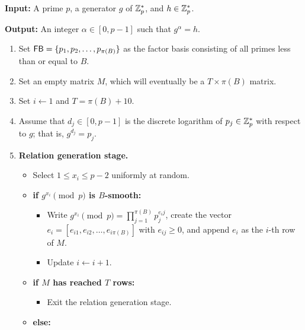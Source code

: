 \begin{algo}~

      {\bf Input:} A prime $p$, a generator $g$ of $\mathbb{Z}_p^*$, and $h \in \mathbb{Z}_p^*$. 
      
      {\bf Output:} An integer $\alpha \in [0, p-1]$ such that $g^\alpha = h$.

      \begin{enumerate}[1.]
            \item Set ${\sf FB} = \{p_1, p_2, \dots, p_{\pi(B)}\}$ as the factor basis 
                  consisting of all primes less than or equal to $B$. 
            \item Set an empty matrix $M$, which will eventually be a $T \times 
                  \pi(B)$ matrix. 
            \item Set $i \gets 1$ and $T = \pi(B) + 10$. 
            \item Assume that $d_j \in [0, p-1]$ is the discrete logarithm 
                  of $p_j \in \mathbb{Z}_p^*$ with respect to $g$; that is, $g^{d_j} = p_j$.
            \item {\bf Relation generation stage.} 
                  \begin{itemize}
                        \item Select $1 \leq x_i \leq p-2$ uniformly at random. 
                        \item {\bf if $g^{x_i} \pmod p$ is $B$-smooth:}
                              \begin{itemize}[$\circ$]
                                    \item Write $g^{x_i} \pmod p = \prod_{j=1}^{\pi(B)} p_j^{e_ij}$, create the 
                                          vector $e_i = [e_{i1}, e_{i2}, \dots, e_{i\pi(B)}]$ with $e_{ij} \geq 0$, 
                                          and append $e_i$ as the $i$-th row of $M$. 
                                    \item Update $i \gets i+1$. 
                              \end{itemize}
                        \item {\bf if $M$ has reached $T$ rows:} 
                              \begin{itemize}[$\circ$]
                                    \item Exit the relation generation stage. 
                              \end{itemize}
                        \item {\bf else:} 

\end{itemize}
\end{enumerate}
\end{algo}
